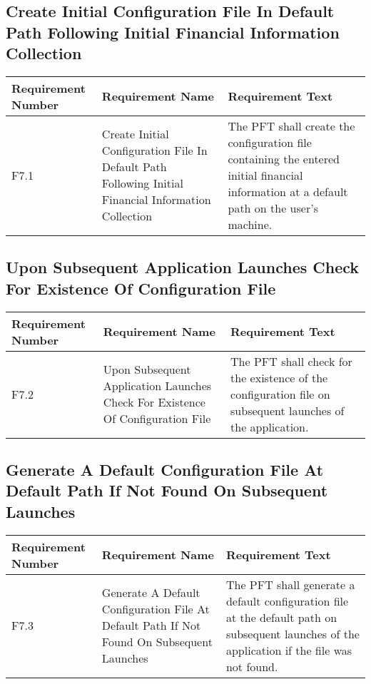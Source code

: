 \documentclass{article}
\begin{document}
\subsection{Create Initial Configuration File In Default Path Following Initial Financial Information Collection}

\begin{longtable}{|p{2cm}|p{6cm}| p{6cm}|}
    \hline
    \textbf{Requirement Number} & \textbf{Requirement Name} & \textbf{Requirement Text}\\
    \hline
    F7.1 & Create Initial Configuration File In Default Path Following Initial Financial Information Collection & The PFT shall create the configuration file containing the entered initial financial information at a default path on the user's machine.  \\
    \hline
\end{longtable}

\subsection{Upon Subsequent Application Launches Check For Existence Of Configuration File}

\begin{longtable}{|p{2cm}|p{6cm}| p{6cm}|}
    \hline
    \textbf{Requirement Number} & \textbf{Requirement Name} & \textbf{Requirement Text}\\
    \hline
    F7.2 & Upon Subsequent Application Launches Check For Existence Of Configuration File & The PFT shall check for the existence of the configuration file on subsequent launches of the application.  \\
    \hline
\end{longtable}

\subsection{Generate A Default Configuration File At Default Path If Not Found On Subsequent Launches}

\begin{longtable}{|p{2cm}|p{6cm}| p{6cm}|}
    \hline
    \textbf{Requirement Number} & \textbf{Requirement Name} & \textbf{Requirement Text}\\
    \hline
    F7.3 & Generate A Default Configuration File At Default Path If Not Found On Subsequent Launches & The PFT shall generate a default configuration file at the default path on subsequent launches of the application if the file was not found.  \\
    \hline
\end{longtable}
\end{document}

